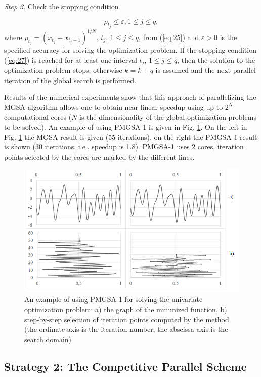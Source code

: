 \documentclass[review]{elsarticle}
\begin{document}
\textit{Step 3}. Check the stopping condition

\begin{equation}\label{eq:27}
\rho_{t_j} \leq \varepsilon, 1 \leq j \leq q,
\end{equation}
where $\rho_{t_j}=(x_{t_j}-x_{t_j-1} )^{1/N}$, $t_j$, $1 \leq j \leq q$, from (\ref{eq:25}) and $\varepsilon > 0$ is the specified accuracy for solving the optimization problem. If the stopping condition (\ref{eq:27}) is reached for at least one interval $t_j$, $1 \leq j \leq q$, then the solution to the optimization problem stops; otherwise $k=k+q$ is assumed and the next parallel iteration of the global search is performed. 

Results of the numerical experiments show that this approach of parallelizing the MGSA algorithm allows one to obtain near-linear speedup using up to $2^N$ computational cores ($N$ is the dimensionality of the global optimization problems to be solved). An example of using PMGSA-1 is given in Fig. \ref{fig:2}. On the left in Fig. \ref{fig:2} the MGSA result is given (55 iterations), on the right the PMGSA-1 result is shown (30 iterations, i.e., speedup is 1.8). PMGSA-1 uses 2 cores, iteration points selected by the cores are marked by the different lines.

\begin{figure}
  \centering
  \includegraphics[width=\linewidth]{fig2}
  \caption{An example of using PMGSA-1 for solving the univariate optimization problem: a) the graph of the minimized function, b) step-by-step selection of iteration points computed by the method (the ordinate axis is the iteration number, the abscissa axis is the search domain)}
  \label{fig:2}
\end{figure}

\subsection{Strategy 2: The Competitive Parallel Scheme} \label{subsec:2}
\end{document}

